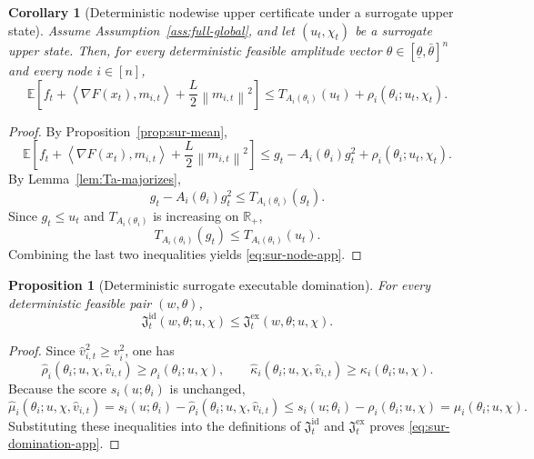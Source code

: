 \documentclass{article}
\newtheorem{proposition}[theorem]{Proposition}
\newtheorem{corollary}[theorem]{Corollary}
\theoremstyle{definition}
\newcommand{\RR}{\mathbb R}
\newcommand{\EE}{\mathbb E}
\newcommand{\norm}[1]{\left\lVert #1\right\rVert}
\newcommand{\ip}[2]{\left\langle #1,#2\right\rangle}
\begin{document}
\begin{corollary}[Deterministic nodewise upper certificate under a surrogate upper state]
\label{cor:sur-node}
Assume Assumption~\ref{ass:full-global}, and let $(u_t,\chi_t)$ be a surrogate
upper state. Then, for every deterministic feasible amplitude vector
$\theta\in[\underline\theta,\bar\theta]^n$ and every node $i\in[n]$,
\begin{equation}
\EE\!\left[
f_t
+
\ip{\nabla F(x_t)}{m_{i,t}}
+
\frac{L}{2}\norm{m_{i,t}}^2
\right]
\le
T_{A_i(\theta_i)}(u_t)+\rho_i(\theta_i;u_t,\chi_t).
\label{eq:sur-node-app}\end{equation}
\end{corollary}

\begin{proof}
By Proposition~\ref{prop:sur-mean},
\[
\EE\!\left[
f_t+\ip{\nabla F(x_t)}{m_{i,t}}+\frac{L}{2}\norm{m_{i,t}}^2
\right]
\le
g_t-A_i(\theta_i)g_t^2+\rho_i(\theta_i;u_t,\chi_t).
\]
By Lemma~\ref{lem:Ta-majorizes},
\[
g_t-A_i(\theta_i)g_t^2\le T_{A_i(\theta_i)}(g_t).
\]
Since $g_t\le u_t$ and $T_{A_i(\theta_i)}$ is increasing on $\RR_+$,
\[
T_{A_i(\theta_i)}(g_t)\le T_{A_i(\theta_i)}(u_t).
\]
Combining the last two inequalities yields \eqref{eq:sur-node-app}.
\end{proof}

\begin{proposition}[Deterministic surrogate executable domination]
\label{prop:sur-domination}
For every deterministic feasible pair $(w,\theta)$,
\begin{equation}
\mathfrak J_t^{\mathrm{id}}(w,\theta;u,\chi)
\le
\mathfrak J_t^{\mathrm{ex}}(w,\theta;u,\chi).
\label{eq:sur-domination-app}\end{equation}
\end{proposition}

\begin{proof}
Since $\widehat v_{i,t}^2\ge v_i^2$, one has
\[
\widehat\rho_i(\theta_i;u,\chi,\widehat v_{i,t})
\ge
\rho_i(\theta_i;u,\chi),
\qquad
\widehat\kappa_i(\theta_i;u,\chi,\widehat v_{i,t})
\ge
\kappa_i(\theta_i;u,\chi).
\]
Because the score $s_i(u;\theta_i)$ is unchanged,
\[
\widehat\mu_i(\theta_i;u,\chi,\widehat v_{i,t})
=
s_i(u;\theta_i)-\widehat\rho_i(\theta_i;u,\chi,\widehat v_{i,t})
\le
s_i(u;\theta_i)-\rho_i(\theta_i;u,\chi)
=
\mu_i(\theta_i;u,\chi).
\]
Substituting these inequalities into the definitions of
$\mathfrak J_t^{\mathrm{id}}$ and $\mathfrak J_t^{\mathrm{ex}}$ proves
\eqref{eq:sur-domination-app}.
\end{proof}
\end{document}
